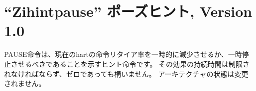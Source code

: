 \begin{comment}
\chapter{``Zihintpause'' Pause Hint, Version 1.0}
\end{comment}
\chapter{``Zihintpause'' ポーズヒント, Version 1.0}
\label{chap:zihintpause}

\begin{comment}
The PAUSE instruction is a HINT that indicates the current hart's rate of
instruction retirement should be temporarily reduced or paused.  The duration of its
effect must be bounded and may be zero.  No architectural state is changed.
\end{comment}

PAUSE命令は、現在のhartの命令リタイア率を一時的に減少させるか、一時停止させるべきであることを示すヒント命令です。
その効果の持続時間は制限されなければならず、ゼロであっても構いません。
アーキテクチャの状態は変更されません。

